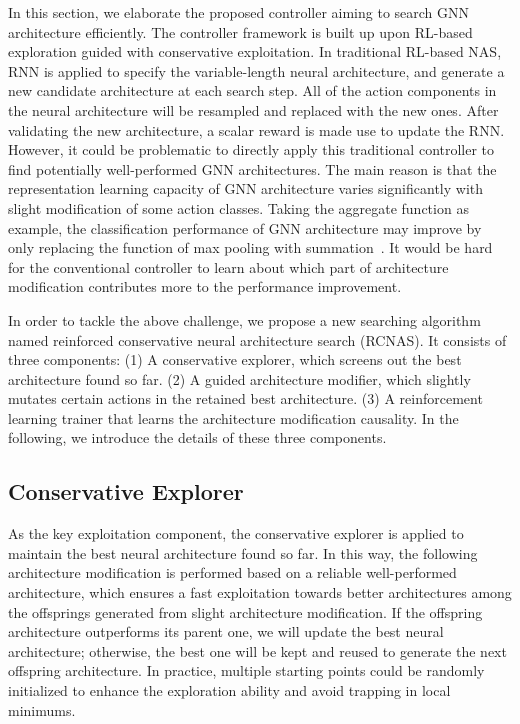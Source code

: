 \documentclass[sigconf]{acmart}
\begin{document}
In this section, we elaborate the proposed controller aiming to search GNN architecture efficiently. The controller framework is built up upon RL-based exploration guided with conservative exploitation. In traditional RL-based NAS, RNN is applied to specify the variable-length neural architecture, and generate a new candidate architecture at each search step. All of the action components in the neural architecture will be resampled and replaced with the new ones. After validating the new architecture, a scalar reward is made use to update the RNN. However, it could be problematic to directly apply this traditional controller to find potentially well-performed GNN architectures. The main reason is that the representation learning capacity of GNN architecture varies significantly with slight modification of some action classes. Taking the aggregate function as example, the classification performance of GNN architecture may improve by only replacing the function of max pooling with summation~\cite{howpowerful}. It would be hard for the conventional controller to learn about which part of architecture modification contributes more to the performance improvement.











In order to tackle the above challenge, we propose a new searching algorithm named reinforced conservative neural architecture search (RCNAS). It consists of three components: (1) A conservative explorer, which screens out the best architecture found so far. (2) A guided architecture modifier, which slightly mutates certain actions in the retained best architecture. (3) A reinforcement learning trainer that learns the architecture modification causality. In the following, we introduce the details of these three components.





\subsection{Conservative Explorer}
As the key exploitation component, the conservative explorer is applied to maintain the best neural architecture found so far. In this way, the following architecture modification is performed based on a reliable well-performed architecture, which ensures a fast exploitation towards better architectures among the offsprings generated from slight architecture modification. If the offspring architecture outperforms its parent one, we will update the best neural architecture; otherwise, the best one will be kept and reused to generate the next offspring architecture. In practice, multiple starting points could be randomly initialized to enhance the exploration ability and avoid trapping in local minimums.
\end{document}

